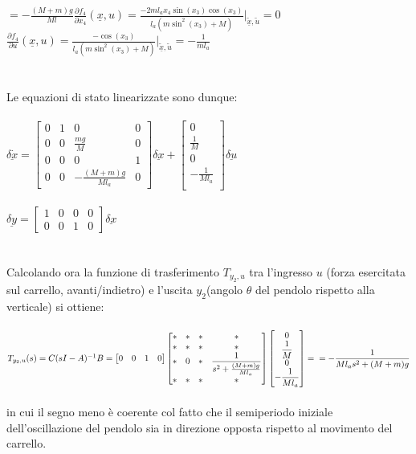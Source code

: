 $=-\displaystyle\frac{(M+m)g}{Ml}$\qquad$\displaystyle\frac{\partial{f_4}}{\partial{x_4}}(\underline{x},u)=\displaystyle\frac{-2ml_ax_4\sin(x_3)\cos(x_3)}{l_a(m\sin^2(x_3)+M)}\bigg|_{\underline{\tilde{x}},\tilde{u}}=0$\\$\displaystyle\frac{\partial{f_4}}{\partial{u}}(\underline{x},u)=\displaystyle\frac{-\cos(x_3)}{l_a(m\sin^2(x_3)+M)}\bigg|_{\underline{\tilde{x}},\tilde{u}}=-\displaystyle\frac{1}{ml_a}$\\\\\\
Le equazioni di stato linearizzate sono dunque:\\\\
$\underline{\delta\dot{x}}=
\begin{bmatrix}
0&1&0&0\\
0&0&\displaystyle\frac{mg}{M}&0\\
0&0&0&1\\
0&0&-\displaystyle\frac{(M+m)g}{Ml_a}&0
\end{bmatrix}
\underline{\delta x}+
\begin{bmatrix}
0\\
\displaystyle\frac{1}{M}\\
0\\
-\displaystyle\frac{1}{Ml_a}\\
\end{bmatrix}
\underline{\delta u}
$\\\\
$\underline{\delta y}=
\begin{bmatrix}
1&0&0&0\\
0&0&1&0
\end{bmatrix}
\underline{\delta x}
$\\\\\\
Calcolando ora la funzione di trasferimento $T_{y_2,u}$ tra l'ingresso $u$ (forza esercitata sul carrello,
avanti/indietro) e l'uscita $y_2$(angolo $\theta$ del pendolo rispetto alla verticale) si ottiene:\\\\
$T_{y_2,u}(s)=C(sI-A)^{-1}B=
\begin{bmatrix}
0&0&1&0
\end{bmatrix}
\begin{bmatrix}
*&*&*&*\\
*&*&*&*\\
*&0&*&\displaystyle\frac{1}{s^2+\frac{(M+m)g}{Ml_a}}\\
*&*&*&*
\end{bmatrix}
\begin{bmatrix}
0\\
\displaystyle\frac{1}{M}\\
0\\
-\displaystyle\frac{1}{Ml_a}\\
\end{bmatrix} = \\
=-\displaystyle\frac{1}{Ml_as^2+(M+m)g}
$\\\\
in cui il segno meno è coerente col fatto che il semiperiodo iniziale dell'oscillazione del pendolo sia in direzione opposta rispetto al movimento del carrello.

